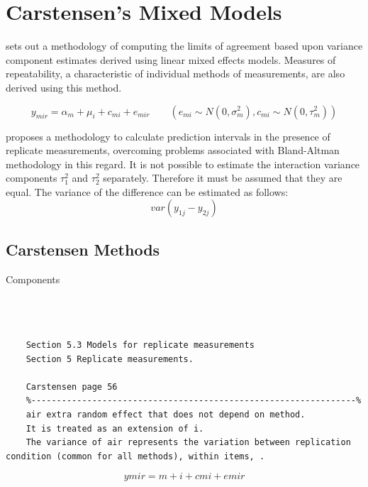 \documentclass[12pt, a4paper]{report}
\theoremstyle{plain}
\theoremstyle{definition}
\theoremstyle{remark}
\begin{document}
	
	\section{Carstensen's Mixed Models}
	
	
	
	\citet{BXC2008} sets out a methodology of computing the limits of
	agreement based upon variance component estimates derived using
	linear mixed effects models. Measures of repeatability, a
	characteristic of individual methods of measurements, are also
	derived using this method.
	
	
	\begin{equation}
	y_{mir}  = \alpha_{m} + \mu_{i} + c_{mi} + e_{mir} \qquad ( e_{mi}
	\sim N(0,\sigma^{2}_{m}), c_{mi} \sim N(0,\tau^{2}_{m}))
	\end{equation}
	
	\citet{BXC2008} proposes a methodology to calculate prediction
	intervals in the presence of replicate measurements, overcoming
	problems associated with Bland-Altman methodology in this regard.
	It is not possible to estimate the interaction variance components
	$\tau^{2}_{1}$ and $\tau^{2}_{2}$ separately. Therefore it must be
	assumed that they are equal. The variance of the difference can be
	estimated as follows:
	\begin{equation}
	var(y_{1j}-y_{2j})
	\end{equation}
	
	
	
	
	
	\subsection{Carstensen Methods}
	
	Components
	
	\begin{verbatim}
	
	
	
	Section 5.3 Models for replicate measurements
	Section 5 Replicate measurements.
	
	Carstensen page 56
	%----------------------------------------------------------------%
	air extra random effect that does not depend on method.
	It is treated as an extension of i.
	The variance of air represents the variation between replication condition (common for all methods), within items, .
	\end{verbatim}
	\[ymir=m+i+cmi+emir\]
	
\end{document}
